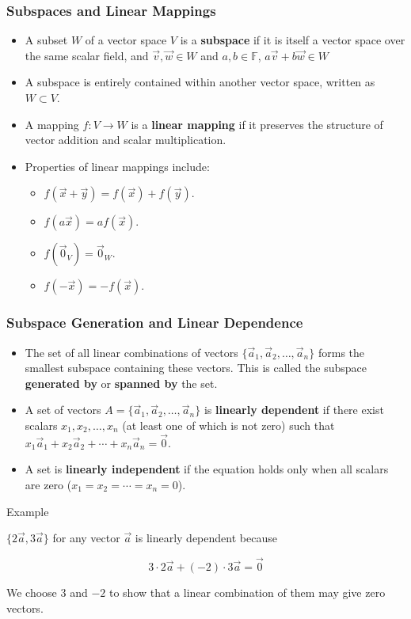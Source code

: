 \documentclass[aspectratio=169,xcolor=dvipsnames,svgnames,x11names,fleqn]{beamer}
\begin{document}
\begin{frame}[allowframebreaks]
\frametitle{Subspaces and Linear Mappings}
\begin{itemize}
    \item A subset $W$ of a vector space $V$ is a \textbf{subspace} if it is itself a vector space over the same scalar field, and $\vec{v}, \vec{w}\in W$ and $a, b \in \mathbb{F}$, $a\vec{v} + b\vec{w} \in W$
    \item A subspace is entirely contained within another vector space, written as $W \subset V$.
    \item A mapping $f: V \to W$ is a \textbf{linear mapping} if it preserves the structure of vector addition and scalar multiplication.
    \item Properties of linear mappings include:
    \begin{itemize}
        \item $f(\vec{x}+\vec{y})=f(\vec{x})+f(\vec{y})$.
        \item $f(a\vec{x})=af(\vec{x})$.
        \item $f(\vec{0}_{V})=\vec{0}_{W}$.
        \item $f(-\vec{x})=-f(\vec{x})$.
    \end{itemize}
\end{itemize}
\end{frame}

\begin{frame}[allowframebreaks]
\frametitle{Subspace Generation and Linear Dependence}
\begin{itemize}
    \item The set of all linear combinations of vectors $\{\vec{a}_1, \vec{a}_2, \dots, \vec{a}_n\}$ forms the smallest subspace containing these vectors. This is called the subspace \textbf{generated by} or \textbf{spanned by} the set.
    \item A set of vectors $A=\{\vec{a}_1, \vec{a}_2, \dots, \vec{a}_n\}$ is \textbf{linearly dependent} if there exist scalars $x_1, x_2, \dots, x_n$ (at least one of which is not zero) such that $x_{1}\vec{a}_{1}+x_{2}\vec{a}_{2}+\cdots+x_{n}\vec{a}_{n}=\vec{0}$.
    \item A set is \textbf{linearly independent} if the equation holds only when all scalars are zero ($x_1=x_2=\cdots=x_n=0$).
\end{itemize}
\end{frame}

\begin{frame}{Example}

    $\{2\vec{a}, 3\vec{a}\}$ for any vector $\vec{a}$ is linearly dependent because 

    $$
    3\cdot 2 \vec{a} + (-2)\cdot 3 \vec{a} = \vec{0}
    $$

    We choose $3$ and $-2$ to show that a linear combination of them may give zero vectors.
    
\end{frame}
\end{document}

